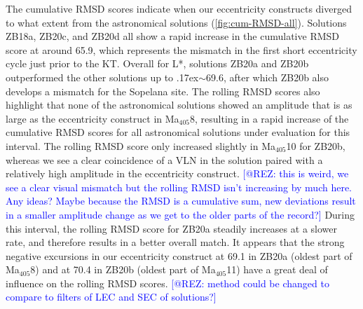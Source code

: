 \documentclass[draft]{agujournal2019}
\newcommand{\appr}{\raise.17ex\hbox{\(\scriptstyle\sim\)}} %
\newcommand{\ma}[1]{Ma\(_{405}\)#1} %
\newcommand{\ijk}{\textcolor{blue}}
\begin{document}
The cumulative \gls{RMSD} scores indicate when our eccentricity constructs diverged to what extent from the astronomical solutions (\cref{fig:cum-RMSD-all}).
Solutions ZB18a, ZB20c, and ZB20d all show a rapid increase in the cumulative \gls{RMSD} score at around \qty{65.9}{\millionyearago}, which represents the mismatch in the first short eccentricity cycle just prior to the \gls{KT}.
Overall for \gls{L*}, solutions ZB20a and ZB20b outperformed the other solutions up to \appr\qty{69.6}{\millionyearago}, after which ZB20b also develops a mismatch for the Sopelana site.
The rolling \gls{RMSD} scores also highlight that none of the astronomical solutions showed an amplitude that is as large as the eccentricity construct in \ma{8}, resulting in a rapid increase of the cumulative \gls{RMSD} scores for all astronomical solutions under evaluation for this interval.
The rolling \gls{RMSD} score only increased slightly in \ma{10} for ZB20b, whereas we see a clear coincidence of a \gls{VLN} in the solution paired with a relatively high amplitude in the eccentricity construct.
\ijk{[@REZ: this is weird, we see a clear visual mismatch but the rolling RMSD isn't increasing by much here. Any ideas? Maybe because the RMSD is a cumulative sum, new deviations result in a smaller amplitude change as we get to the older parts of the record?]}
During this interval, the rolling \gls{RMSD} score for ZB20a steadily increases at a slower rate, and therefore results in a better overall match.
It appears that the strong negative excursions in our eccentricity construct
at \qty{69.1}{\millionyearago} in ZB20a (oldest part of \ma{8})
and at \qty{70.4}{\millionyearago} in ZB20b (oldest part of \ma{11})
have a great deal of influence on the rolling \gls{RMSD} scores.
\ijk{[@REZ: method could be changed to compare to filters of LEC and SEC of solutions?]}

\end{document}
